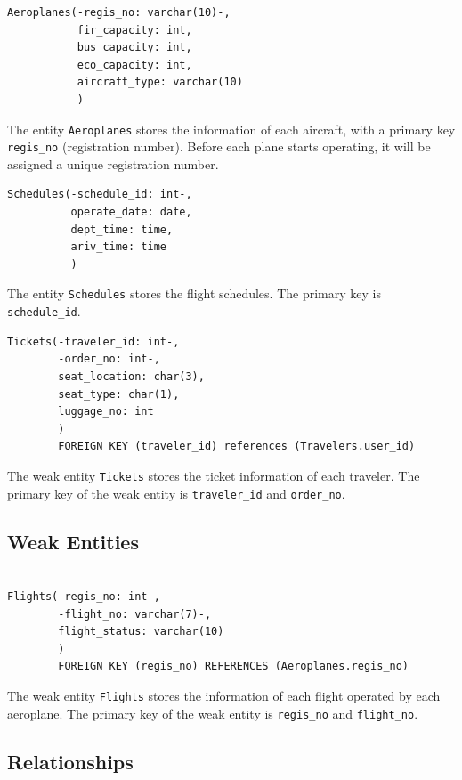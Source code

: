 \documentclass{article}
\begin{document}
	\begin{lstlisting}[keepspaces=true]               
Aeroplanes(-regis_no: varchar(10)-,
           fir_capacity: int,
           bus_capacity: int, 
           eco_capacity: int,
           aircraft_type: varchar(10)
           )
	\end{lstlisting}    
	The entity \texttt{Aeroplanes} stores the information of each aircraft, with a primary key \texttt{regis\_no} (registration number). Before each plane starts operating, it will be assigned a unique registration number.
	
	\begin{lstlisting}[keepspaces=true] 
Schedules(-schedule_id: int-, 
          operate_date: date,
          dept_time: time,
          ariv_time: time
          )
	\end{lstlisting}
	The entity \texttt{Schedules} stores the flight schedules. The primary key is \texttt{schedule\_id}.
	
	\begin{lstlisting}[keepspaces=true]
Tickets(-traveler_id: int-, 
        -order_no: int-, 
        seat_location: char(3),
        seat_type: char(1),
        luggage_no: int
        )
        FOREIGN KEY (traveler_id) references (Travelers.user_id)
	\end{lstlisting}    
	The weak entity \texttt{Tickets} stores the ticket information of each traveler. The primary key of the weak entity is \texttt{traveler\_id} and \texttt{order\_no}. 
	
	\subsection{Weak Entities}
	\begin{lstlisting}[keepspaces=true]        
		
Flights(-regis_no: int-, 
        -flight_no: varchar(7)-,
        flight_status: varchar(10)
        )
        FOREIGN KEY (regis_no) REFERENCES (Aeroplanes.regis_no)
	\end{lstlisting}
	The weak entity \texttt{Flights} stores the information of each flight operated by each aeroplane. The primary key of the weak entity is \texttt{regis\_no} and \texttt{flight\_no}.

	\subsection{Relationships}
	
\end{document}
